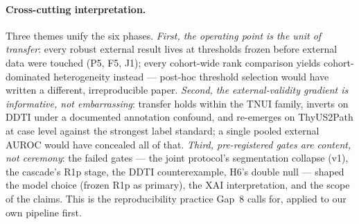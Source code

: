 \documentclass[jimh,article,submit,moreauthors,pdftex]{Definitions/tsp}
\begin{document}
\paragraph{Cross-cutting interpretation.}
Three themes unify the six phases. \emph{First, the operating point is the
unit of transfer}: every robust external result lives at thresholds frozen
before external data were touched (P5, F5, J1); every cohort-wide rank
comparison yields cohort-dominated heterogeneity instead --- post-hoc
threshold selection would have written a different, irreproducible paper.
\emph{Second, the external-validity gradient is informative, not
embarrassing}: transfer holds within the TNUI family, inverts on DDTI
under a documented annotation confound, and re-emerges on ThyUS2Path at
case level against the strongest label standard; a single pooled external
AUROC would have concealed all of that. \emph{Third, pre-registered gates
are content, not ceremony}: the failed gates --- the joint protocol's
segmentation collapse (v1), the cascade's R1p stage, the DDTI
counterexample, H6's double null --- shaped the model choice (frozen R1p
as primary), the XAI interpretation, and the scope of the claims. This is
the reproducibility practice Gap~8 calls for, applied to our own pipeline
first.
\end{document}
